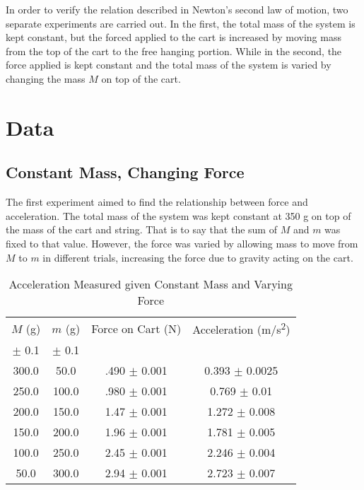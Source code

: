 \documentclass[11pt]{article}
\begin{document}
In order to verify the relation described in Newton's second law of motion, two separate experiments are carried out. In the first, the total mass of the system is kept constant, but the forced applied to the cart is increased by moving mass from the top of the cart to the free hanging portion. While in the second, the force applied is kept constant and the total mass of the system is varied by changing the mass \(M\) on top of the cart.

\section{Data}
\subsection{Constant Mass, Changing Force}
The first experiment aimed to find the relationship between force and acceleration. The total mass of the system was kept constant at 350 g on top of the mass of the cart and string. That is to say that the sum of \(M\) and \(m\) was fixed to that value. However, the force was varied by allowing mass to move from \(M\) to \(m\) in different trials, increasing the force due to gravity acting on the cart.
\begin{table}[h]
	\centering
	\caption{Acceleration Measured given Constant Mass and Varying Force}
\begin{tabular}{|c|c|c|c|}
\hline
\(M\) (g) & \(m\) (g) & Force on Cart (N) & Acceleration (m/s\textsuperscript{2})
\\
\(\pm\) 0.1 & \(\pm\) 0.1  & &\\
\hline
300.0 & 50.0 & .490 \( \pm  \) 0.001 & 0.393 \(\pm\) 0.0025 \\
250.0 & 100.0 & .980 \( \pm  \) 0.001 & 0.769 \(\pm\) 0.01 \\
200.0 & 150.0 & 1.47 \( \pm  \) 0.001 & 1.272 \(\pm\) 0.008 \\
150.0 & 200.0 & 1.96 \( \pm  \) 0.001 & 1.781 \(\pm\) 0.005 \\
100.0 & 250.0 & 2.45 \( \pm  \) 0.001 & 2.246 \(\pm\) 0.004 \\
50.0 & 300.0 & 2.94 \( \pm  \) 0.001 & 2.723 \(\pm\) 0.007 \\
 
 \hline
\end{tabular}
\end{table}
\end{document}
